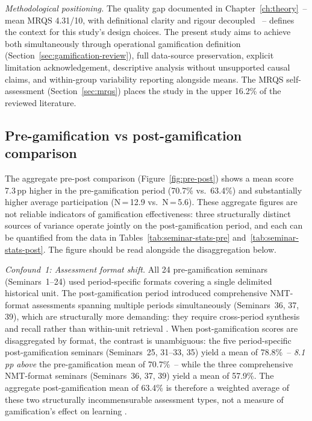 \textit{Methodological positioning.} The quality gap documented in Chapter~\ref{ch:theory}~-- mean MRQS 4.31/10, with definitional clarity and rigour decoupled \cite{Korniienko2025mrqs}~-- defines the context for this study's design choices. The present study aims to achieve both simultaneously through operational gamification definition (Section~\ref{sec:gamification-review}), full data-source preservation, explicit limitation acknowledgement, descriptive analysis without unsupported causal claims, and within-group variability reporting alongside means. The MRQS self-assessment (Section~\ref{sec:mrqs}) places the study in the upper 16.2\% of the reviewed literature.

\subsection{Pre-gamification vs post-gamification comparison}

The aggregate pre-post comparison (Figure~\ref{fig:pre-post}) shows a mean score 7.3\,pp higher in the pre-gamification period (70.7\% vs.\ 63.4\%) and substantially higher average participation (N\,=\,12.9 vs.\ N\,=\,5.6). These aggregate figures are not reliable indicators of gamification effectiveness: three structurally distinct sources of variance operate jointly on the post-gamification period, and each can be quantified from the data in Tables~\ref{tab:seminar-stats-pre} and~\ref{tab:seminar-stats-post}. The figure should be read alongside the disaggregation below.

\textit{Confound~1: Assessment format shift.} All 24 pre-gamification seminars (Seminars~1--24) used period-specific formats covering a single delimited historical unit. The post-gamification period introduced comprehensive NMT-format assessments spanning multiple periods simultaneously (Seminars~36, 37, 39), which are structurally more demanding: they require cross-period synthesis and recall rather than within-unit retrieval \cite{Wineburg2001}. When post-gamification scores are disaggregated by format, the contrast is unambiguous: the five period-specific post-gamification seminars (Seminars~25, 31--33, 35) yield a mean of 78.8\%~-- \emph{8.1\,pp above} the pre-gamification mean of 70.7\%~-- while the three comprehensive NMT-format seminars (Seminars~36, 37, 39) yield a mean of 57.9\%. The aggregate post-gamification mean of 63.4\% is therefore a weighted average of these two structurally incommensurable assessment types, not a measure of gamification's effect on learning \cite{Clark2016, Connolly2012}.

